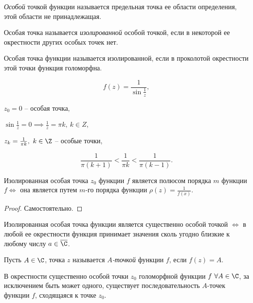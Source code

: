 \begin{definition}
	\emph{Особой} точкой функции называется предельная точка ее области определения, этой области не принадлежащая.
\end{definition}

\begin{definition}
	Особая точка называется \emph{изолированной} особой точкой, если в некоторой ее окрестности других особых точек нет.
\end{definition}

\begin{remark}
	Особая точка функции называется изолированной, если в проколотой окрестности этой точки функция голоморфна.
\end{remark}

\begin{eg}
	\[
		f(z) = \frac{1}{\sin \frac{1}{z} },
	\]

	$z_0 = 0$ -- особая точка,

	$\sin \frac{1}{z} = 0 \implies  \frac{1}{z} = \pi k, \ k \in Z$,

	$z_k = \frac{1}{\pi k} , \ k \in \Z$ -- особые точки,

	\[
		\frac{1}{\pi(k+1)} < \frac{1}{\pi k} < \frac{1}{\pi (k-1)}.
	\]
\end{eg}

\begin{theorem}
	Изолированная особая точка $z_0$ функции $f$ является полюсом порядка $m$ функции $f \iff $ она является путем $m$-го порядка функции $\rho (z)= \frac{1}{f(x)} $.
\end{theorem}

\begin{proof}
	Самостоятельно.
\end{proof}

\begin{theorem}[Сохоцкий]
	Изолированная особая точка функции является существенно особой точкой $\iff $ в любой ее окрестности функция принимает значения сколь угодно близкие к любому числу $a \in \overline{\C} $.
\end{theorem}

\begin{definition}[$A$-точка]
	Пусть $A \in \C$, точка $z$ называется \emph{$A$-точкой} функции $f$, если $f(z) = A$.
\end{definition}

\begin{theorem}
	В окрестности существенно особой точки $z_0$ голоморфной функции $f \ \forall A \in \C$, за исключением быть может одного, существует последовательность $A$-точек функции $f$, сходящаяся к точке $z_0$.
\end{theorem}

